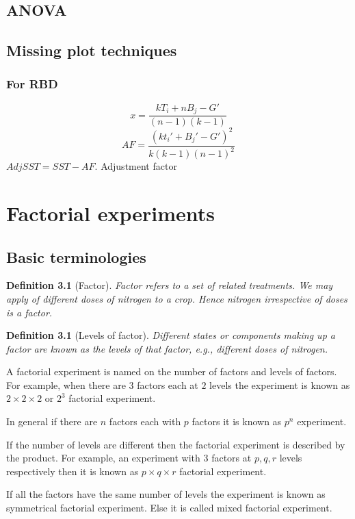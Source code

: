 \documentclass[oneside,11pt,pdftex]{book}%
\numberwithin{equation}{section}
\newtheorem{definition}[theorem]{Definition}
\numberwithin{section}{chapter}
\numberwithin{equation}{chapter}
\begin{document}
\section{ANOVA}

\section{Missing plot techniques}

\subsection{For RBD}
\[ x=\frac{kT_i+nB_j-G'}{(n-1)(k-1)} \]
\[ AF=\frac{(kt_i'+B_j'-G')^2}{k(k-1)(n-1)^2} \]
$ Adj SST= SST-AF $.
Adjustment factor


\chapter{Factorial experiments}
\section{Basic terminologies}
\begin{definition}[Factor]
	Factor refers to a set of related treatments. We may apply of different doses of nitrogen to a crop. Hence nitrogen irrespective of doses is a factor.
\end{definition}
\begin{definition}[Levels of factor]
	Different states or components making up a factor are known as the levels of that factor, e.g., different doses of nitrogen.
\end{definition}


A factorial experiment is named on the number of factors and levels of factors. For example, when there are $ 3 $ factors each at $ 2 $ levels the experiment is known as $ 2\times2\times2  $ or $ 2^3 $ factorial experiment.

In general if there are $ n $ factors each with $ p $ factors it is known as $ p^n $ experiment.

If the number of levels are different then the factorial experiment is described by the product. For example, an experiment with $ 3 $ factors at $ p,q,r$ levels respectively then it is known as $ p \times q \times r  $ factorial experiment.

If all the factors have the same number of levels the experiment is known as symmetrical factorial experiment. Else it is called mixed factorial experiment.
\end{document}
